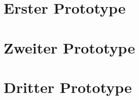 \documentclass[a4paper,11pt]{article}
\begin{document}
\begin{sloppypar}




\newpage
\renewcommand{\contentsname}{Inhaltsverzeichnis}
\tableofcontents
\clearpage


\renewcommand{\headrulewidth}{0pt}
\pagestyle{fancy} \fancyhf{} \rhead{\leftmark} \cfoot{\thepage}





\newpage
\renewcommand{\headrulewidth}{0.5pt}
\fancyhf{} \cfoot{\thepage}  %
\part{Erster Prototype}



%


\newpage
\fancyhf{} \cfoot{\thepage}  %
\part{Zweiter Prototype}



\newpage
\fancyhf{} \cfoot{\thepage}  %
\part{Dritter Prototype}




\end{sloppypar}
\end{document}
